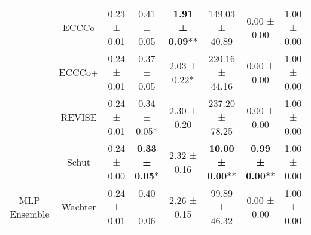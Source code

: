\begin{table}
{\begin{tabular}[t]{cccccccc}
 & ECCCo & 0.23 ± 0.01\hphantom{*}\hphantom{*} & 0.41 ± 0.05\hphantom{*}\hphantom{*} & \textbf{1.91 ± 0.09}** & 149.03 ± 40.89\hphantom{*}\hphantom{*} & 0.00 ± 0.00\hphantom{*}\hphantom{*} & 1.00 ± 0.00\hphantom{*}\hphantom{*}\\

 & ECCCo+ & 0.24 ± 0.01\hphantom{*}\hphantom{*} & 0.37 ± 0.05\hphantom{*}\hphantom{*} & 2.03 ± 0.22*\hphantom{*} & 220.16 ± 44.16\hphantom{*}\hphantom{*} & 0.00 ± 0.00\hphantom{*}\hphantom{*} & 1.00 ± 0.00\hphantom{*}\hphantom{*}\\

 & REVISE & 0.24 ± 0.01\hphantom{*}\hphantom{*} & 0.34 ± 0.05*\hphantom{*} & 2.30 ± 0.20\hphantom{*}\hphantom{*} & 237.20 ± 78.25\hphantom{*}\hphantom{*} & 0.00 ± 0.00\hphantom{*}\hphantom{*} & 1.00 ± 0.00\hphantom{*}\hphantom{*}\\

 & Schut & 0.24 ± 0.00\hphantom{*}\hphantom{*} & \textbf{0.33 ± 0.05}*\hphantom{*} & 2.32 ± 0.16\hphantom{*}\hphantom{*} & \textbf{10.00 ± 0.00}** & \textbf{0.99 ± 0.00}** & 1.00 ± 0.00\hphantom{*}\hphantom{*}\\

\multirow[t]{-6}{*}{\centering\arraybackslash MLP Ensemble} & Wachter & 0.24 ± 0.01\hphantom{*}\hphantom{*} & 0.40 ± 0.06\hphantom{*}\hphantom{*} & 2.26 ± 0.15\hphantom{*}\hphantom{*} & 99.89 ± 46.32\hphantom{*}\hphantom{*} & 0.00 ± 0.00\hphantom{*}\hphantom{*} & 1.00 ± 0.00\hphantom{*}\hphantom{*}\\
\bottomrule
\end{tabular}}
\end{table}
